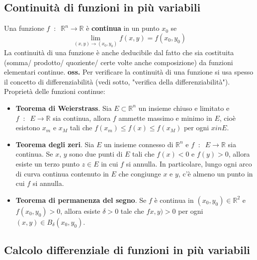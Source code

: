 \subsection{Continuità di funzioni in più variabili}
Una funzione $f \;\;:\;\; \mathbb{R}^n \rightarrow  \mathbb{R}$ è \textbf{continua} in un punto $x_0$ se 
\[
    \lim_{(x,y)\rightarrow (x_0,y_0)} f(x,y) = f(x_0,y_0)
\]
La continuità di una funzione è anche deducibile dal fatto che sia costituita (somma/ prodotto/ quoziente/ certe volte anche composizione) da funzioni elementari continue.
\newline
\newline
\textbf{oss.} Per verificare la continuità di una funzione si usa spesso il concetto di differenziabilità (vedi sotto, "verifica della differenziabilità").
\newline
\newline
Proprietà delle funzioni continue:
\begin{itemize}
    \item \textbf{Teorema di Weierstrass}. Sia $E \subset \mathbb{R}^n$ un insieme chiuso e limitato e $f \;\;:\;\; E \rightarrow \mathbb{R}$ sia continua, allora $f$ ammette massimo e minimo in $E$, cioè esistono $x_m$ e $x_M$ tali che $f(x_m) \leq f(x) \leq f(x_M)$ per ogni $x in E$.
    \item \textbf{Teorema degli zeri}. Sia $E$ un insieme connesso di $\mathbb{R}^n$ e $f \;\;:\;\; E \rightarrow \mathbb{R}$ sia continua. Se $x$, $y$ sono due punti di $E$ tali che $ f(x) < 0$ e $f(y) > 0$, allora esiste un terzo punto $z \in E$ in cui $f$ si annulla. In particolare, lungo ogni arco di curva continua contenuto in $E$ che congiunge $x$ e $y$, c'è almeno un punto in cui $f$ si annulla.
    \item \textbf{Teorema di permanenza del segno}. Se $f$ è continua in $(x_0, y_0) \in \mathbb{R}^2$ e $f(x_0, y_0) > 0$, allora esiste $\delta>0$ tale che $fx,y) > 0$ per ogni $(x,y) \in B_\delta(x_0,y_0)$.
\end{itemize}
\subsection{Calcolo differenziale di funzioni in più variabili}
